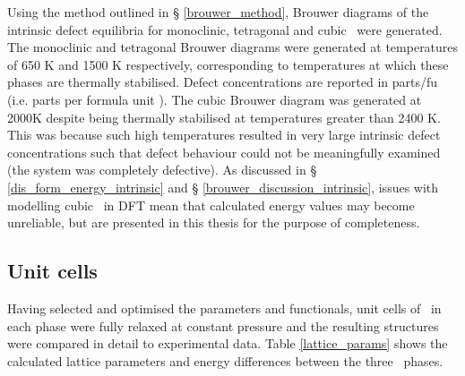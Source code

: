 Using the method outlined in § \ref{brouwer_method}, Brouwer diagrams of the intrinsic defect equilibria for monoclinic, tetragonal and cubic \zirconia\ were generated. The monoclinic and tetragonal Brouwer diagrams were generated at temperatures of 650 K and 1500 K respectively, corresponding to temperatures at which these phases are thermally stabilised. Defect concentrations are reported in parts/fu (i.e. parts per formula unit \zirconia). The cubic Brouwer diagram was generated at 2000K despite being thermally stabilised at temperatures greater than 2400 K. This was because such high temperatures resulted in very large intrinsic defect concentrations such that defect behaviour could not be meaningfully examined (the system was completely defective). As discussed in § \ref{dis_form_energy_intrinsic} and § \ref{brouwer_discussion_intrinsic}, issues with modelling cubic \zirconia\ in DFT mean that calculated energy values may become unreliable, but are presented in this thesis for the purpose of completeness.

%

\subsection{Unit cells}

Having selected and optimised the parameters and functionals, unit cells of \zirconia\ in each phase were fully relaxed at constant pressure and the resulting structures were compared in detail to experimental data. Table \ref{lattice_params} shows the calculated lattice parameters and energy differences between the three \zirconia\ phases. 

